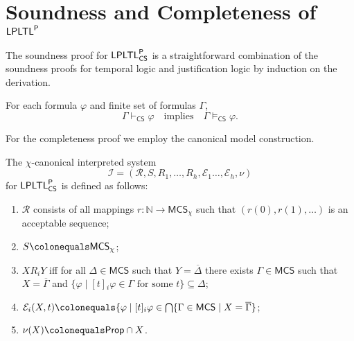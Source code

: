 \documentclass[envcountsect,envcountsame,oribibl,orivec]{llncs}
\newcommand{\Prop}{\textsf{Prop}}
\newcommand{\LPLTLp}{\textsf{LPLTL}^{\sf P}}
\newcommand{\jbox}[1]{\left[#1\right]\!}
\newcommand{\CS}{\textsf{CS}}
\newcommand{\numberofagents}{h}
\newcommand{\agent}{i}
\newcommand{\runs}{\mathcal{R}}
\newcommand{\system}{\mathcal{I}}
\newcommand{\evidence}{\mathcal{E}}
\newcommand{\valuation}{\nu}
\newcommand{\N}{\mathbb{N}}
\renewcommand{\phi}{\varphi}
\newcommand{\MCS}{\mathsf{MCS}}
\begin{document}
\section{Soundness and Completeness of $\LPLTLp$}
\label{sec:Completeness}

The soundness proof for $\LPLTLp_\CS$ is a straightforward combination of the soundness proofs for temporal logic and justification logic by induction on the derivation.

\begin{theorem}[Soundness]
		For each formula $\phi$ and finite set of formulas $\Gamma$,
	\[
	 \Gamma\vdash_\CS \phi  \quad\text{implies}\quad  \Gamma \models_\CS  \phi.
	\]
\end{theorem}

For the completeness proof we employ the canonical model construction.

\begin{definition}\label{def:canonical interpreted systems for LPLTL}
	The $\chi$-canonical interpreted system 
	\[
	\system = (\runs, S, R_1,\ldots,R_\numberofagents, \evidence_1\ldots,\evidence_\numberofagents, \valuation)
	\] 
	for $\LPLTLp_\CS$ is defined as follows:
	\begin{enumerate}
		\item $\runs$ consists of all mappings $r: \N \to \MCS_\chi$ such that
		$(r(0), r(1), \ldots)$ is an acceptable sequence;
		\item $S \colonequals \MCS_\chi$;
		
		\item $X R_\agent Y$ if{f} for all $\Delta \in \MCS$ such that $Y = \overline{\Delta}$ there exists $\Gamma \in \MCS$ such that $X = \overline{\Gamma}$ and  
		$\{ \phi \mid  \jbox{t}_\agent \phi \in \Gamma   \text{ for some $t$}\} \subseteq \Delta$; 
		
		\item $\evidence_\agent (X, t) \colonequals \{ \phi \mid \jbox{t}_\agent \phi \in \bigcap \{ \Gamma \in \MCS \mid X = \overline{\Gamma} \}$;
		\item $\valuation(X) \colonequals \Prop\cap X$.
	\end{enumerate}
\end{definition}
\end{document}
